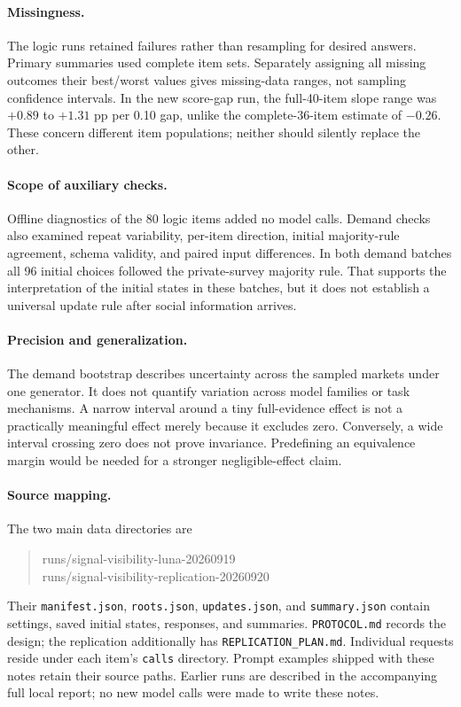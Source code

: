 \documentclass[11pt]{article}
\begin{document}
\paragraph{Missingness.}
The logic runs retained failures rather than resampling for desired answers. Primary summaries used complete item sets. Separately assigning all missing outcomes their best/worst values gives missing-data ranges, not sampling confidence intervals. In the new score-gap run, the full-40-item slope range was $+0.89$ to $+1.31$ pp per 0.10 gap, unlike the complete-36-item estimate of $-0.26$. These concern different item populations; neither should silently replace the other.

\paragraph{Scope of auxiliary checks.}
Offline diagnostics of the 80 logic items added no model calls. Demand checks also examined repeat variability, per-item direction, initial majority-rule agreement, schema validity, and paired input differences. In both demand batches all 96 initial choices followed the private-survey majority rule. That supports the interpretation of the initial states in these batches, but it does not establish a universal update rule after social information arrives.

\paragraph{Precision and generalization.}
The demand bootstrap describes uncertainty across the sampled markets under one generator. It does not quantify variation across model families or task mechanisms. A narrow interval around a tiny full-evidence effect is not a practically meaningful effect merely because it excludes zero. Conversely, a wide interval crossing zero does not prove invariance. Predefining an equivalence margin would be needed for a stronger negligible-effect claim.

\paragraph{Source mapping.}
The two main data directories are
\begin{quote}\small\ttfamily
runs/signal-visibility-luna-20260919\\
runs/signal-visibility-replication-20260920
\end{quote}
Their \texttt{manifest.json}, \texttt{roots.json}, \texttt{updates.json}, and \texttt{summary.json} contain settings, saved initial states, responses, and summaries. \texttt{PROTOCOL.md} records the design; the replication additionally has \texttt{REPLICATION\_PLAN.md}. Individual requests reside under each item's \texttt{calls} directory. Prompt examples shipped with these notes retain their source paths. Earlier runs are described in the accompanying full local report; no new model calls were made to write these notes.
\end{document}

